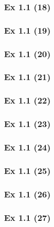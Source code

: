 \subsubsection{Ex 1.1 (18)}\label{sec:Ex_1.1.18}

\subsubsection{Ex 1.1 (19)}\label{sec:Ex_1.1.19}

\subsubsection{Ex 1.1 (20)}\label{sec:Ex_1.1.20}

\newpage		%

\subsubsection{Ex 1.1 (21)}\label{sec:Ex_1.1.21}

\subsubsection{Ex 1.1 (22)}\label{sec:Ex_1.1.22}

\subsubsection{Ex 1.1 (23)}\label{sec:Ex_1.1.23}

\subsubsection{Ex 1.1 (24)}\label{sec:Ex_1.1.24}

\subsubsection{Ex 1.1 (25)}\label{sec:Ex_1.1.25}

\subsubsection{Ex 1.1 (26)}\label{sec:Ex_1.1.26}

\subsubsection{Ex 1.1 (27)}\label{sec:Ex_1.1.27}

